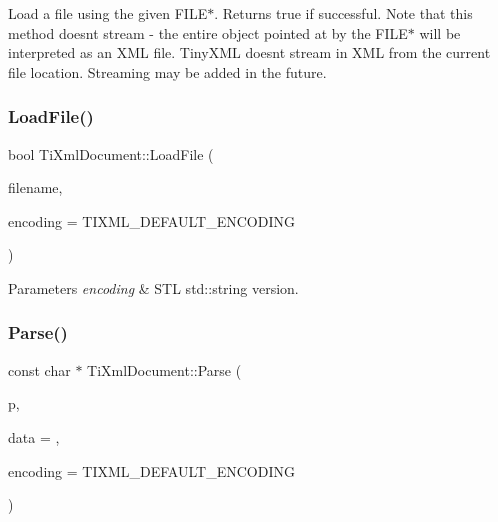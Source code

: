Load a file using the given F\+I\+L\+E$\ast$. Returns true if successful. Note that this method doesn\textquotesingle{}t stream -\/ the entire object pointed at by the F\+I\+L\+E$\ast$ will be interpreted as an X\+ML file. Tiny\+X\+ML doesn\textquotesingle{}t stream in X\+ML from the current file location. Streaming may be added in the future. \mbox{\label{class_ti_xml_document_a18ae6ed34fed7991ebc220862dfac884}} 
\subsubsection{\texorpdfstring{Load\+File()}{LoadFile()}\hspace{0.1cm}{\footnotesize\ttfamily [3/3]}}
{\footnotesize\ttfamily bool Ti\+Xml\+Document\+::\+Load\+File (\begin{DoxyParamCaption}\item[{const std\+::string \&}]{filename,  }\item[{Ti\+Xml\+Encoding}]{encoding = {\ttfamily TIXML\+\_\+DEFAULT\+\_\+ENCODING} }\end{DoxyParamCaption})\hspace{0.3cm}{\ttfamily [inline]}}


\begin{DoxyParams}{Parameters}
{\em encoding} & S\+TL std\+::string version. \\
\hline
\end{DoxyParams}
\mbox{\label{class_ti_xml_document_a789ad2f06f93d52bdb5570b2f3670289}} 
\subsubsection{\texorpdfstring{Parse()}{Parse()}}
{\footnotesize\ttfamily const char $\ast$ Ti\+Xml\+Document\+::\+Parse (\begin{DoxyParamCaption}\item[{const char $\ast$}]{p,  }\item[{\hyperlink{class_ti_xml_parsing_data}{Ti\+Xml\+Parsing\+Data} $\ast$}]{data = {},  }\item[{Ti\+Xml\+Encoding}]{encoding = {\ttfamily TIXML\+\_\+DEFAULT\+\_\+ENCODING} }\end{DoxyParamCaption})\hspace{0.3cm}{\ttfamily [virtual]}}


